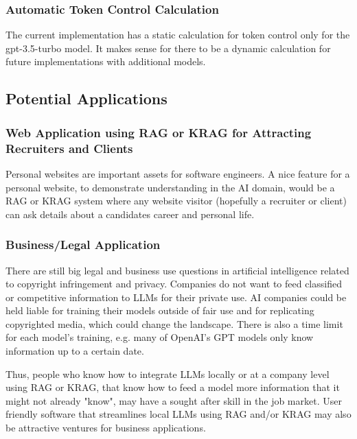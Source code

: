 \subsubsection{Automatic Token Control Calculation}
The current implementation has a static calculation for token control only for the gpt-3.5-turbo model. It makes sense for there to be a dynamic calculation for future implementations with additional models.

\subsection{Potential Applications}
\subsubsection{Web Application using RAG or KRAG for Attracting Recruiters and Clients}
Personal websites are important assets for software engineers. A nice feature for a personal website, to demonstrate understanding in the AI domain, would be a RAG or KRAG system where any website visitor (hopefully a recruiter or client) can ask details about a candidates career and personal life.

\subsubsection{Business/Legal Application}
There are still big legal and business use questions in artificial intelligence related to copyright infringement and privacy. Companies do not want to feed classified or competitive information to LLMs for their private use. AI companies could be held liable for training their models outside of fair use and for replicating copyrighted media, which could change the landscape. There is also a time limit for each model's training, e.g. many of OpenAI's GPT models only know information up to a certain date. 
\par

Thus, people who know how to integrate LLMs locally or at a company level using RAG or KRAG, that know how to feed a model more information that it might not already "know", may have a sought after skill in the job market. User friendly software that streamlines local LLMs using RAG and/or KRAG may also be attractive ventures for business applications.